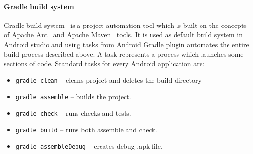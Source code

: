 \paragraph{Gradle build system}
Gradle build system~\cite{Gradle} is a project automation tool which is built on the concepts of Apache Ant~\cite{Ant}
and Apache Maven~\cite{Maven} tools. It is used as default build system in Android studio and using tasks from Android
Gradle plugin automates the entire build process described above. A task represents a process which launches some
sections of code. Standard tasks for every Android application are:
\begin{itemize}
  \item \texttt{gradle clean} -- cleans project and deletes the build directory.
  \item \texttt{gradle assemble} -- builds the project.
  \item \texttt{gradle check} -- runs checks and tests.
  \item \texttt{gradle build} -- runs both assemble and check.
  \item \texttt{gradle assembleDebug} -- creates debug .apk file.
\end{itemize}
